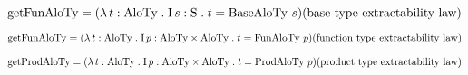 \documentclass{article}
\newcommand{\axNote}[1]{\hfill (\text{#1})}
\newcommand{\axNoteNL}[1]{\\ \text{} \axNote{#1}}
\begin{document}
\begin{theory-ext}
{%



\item $\text{getFunAloTy} = \cFunAbs{t}{\text{AloTy}} {\cDefDesX{s}{\text{S}}{t = \text{BaseAloTy}\ s
    }}
    \axNoteNL{base type extractability law}
    $



    
\item $\text{getFunAloTy} = 
\cFunAbs{t}{\text{AloTy}}{
\cDefDesX{p}{\text{AloTy}\times \text{AloTy}}{
        {t = \text{FunAloTy}\ p}
    }}
    \axNoteNL{function type extractability law}
    $



\item $\text{getProdAloTy} = 
\cFunAbs{t}{\text{AloTy}}{
\cDefDesX{p}{\text{AloTy}\times \text{AloTy}}{
        {t = \text{ProdAloTy}\ p}
    }}
    \axNoteNL{product type extractability law}
    $

    
\ee
}
\end{theory-ext}
\end{document}
